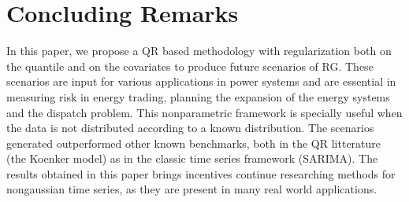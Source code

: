 \section{Concluding Remarks}

In this paper, we propose a QR based methodology with regularization both on the quantile and on the covariates to produce future scenarios of RG. These scenarios are input for various applications in power systems and are essential in measuring risk in energy trading, planning the expansion of the energy systems and the dispatch problem. This nonparametric framework is specially useful when the data is not distributed according to a known distribution. The scenarios generated outperformed other known benchmarks, both in the QR litterature (the Koenker model) as in the classic time series framework (SARIMA). The results obtained in this paper brings incentives continue researching methods for nongaussian time series, as they are present in many real world applications. 